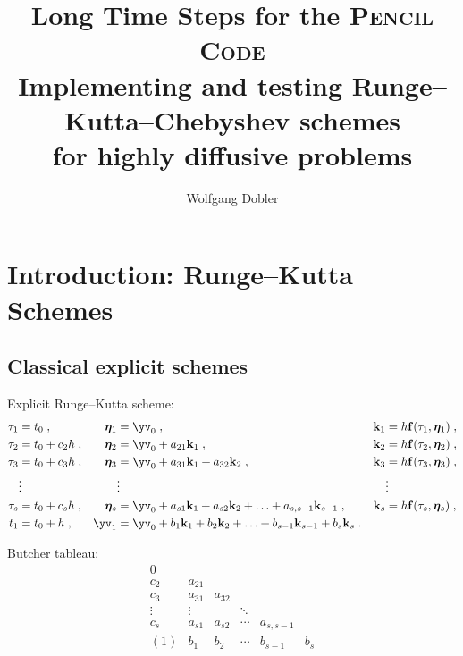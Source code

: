 \documentclass[\mydriver,12pt,twoside,notitlepage]{article}
\title{Long Time Steps for the \textsc{Pencil Code}\\[1.5ex]
  {\large Implementing and testing Runge--Kutta--Chebyshev schemes\\
    for highly diffusive problems}
}
\author{Wolfgang Dobler}
\newcommand{\etav}    {\bm{\eta}}
\newcommand{\fv}      {\mathbf{f}}
\newcommand{\kv}      {\mathbf{k}}
\begin{document}
\thispagestyle{empty}

\maketitle

\clearpage
\tableofcontents
\clearpage

\section{Introduction: Runge--Kutta Schemes}

\subsection{Classical explicit schemes}
Explicit Runge--Kutta scheme:
\begin{align}
  \tau_1 &= t_0 \; ,
            & \etav_1 &= \yv_0 \; ,
                         & \kv_1 &= h\fv(\tau_1, \etav_1) \; ,\\
  \tau_2 &= t_0 + c_2 h \; ,
            & \etav_2 &= \yv_0 + a_{21} \kv_1 \; ,
                         & \kv_2 &= h\fv(\tau_2, \etav_2) \; ,\\
  \tau_3 &= t_0 + c_3 h \; ,
            & \etav_3 &= \yv_0 + a_{31} \kv_1 + a_{32} \kv_2 \; ,
                         & \kv_3 &= h\fv(\tau_3, \etav_3) \; ,\\
  & \vdots &  & \vdots  &  &\vdots \nonumber \\
  \tau_s &= t_0 + c_s h \; ,
            & \etav_s &= \yv_0 + a_{s1} \kv_1 + a_{s2} \kv_2
             + \ldots + a_{s,s-1} \kv_{s-1} \; ,
                              & \kv_s &= h\fv(\tau_s, \etav_s) \; ,\\
  t_1 &= t_0 + h \; ,
            & \yv_1   &= \yv_0 + b_1 \kv_1 + b_2 \kv_2
                         + \ldots + b_{s-1} \kv_{s-1} + b_{s} \kv_{s} \; .
\end{align}


Butcher tableau:
\begin{equation}
  \begin{array}{c|ccccc}
    0                                                 \\
    c_2    & a_{21}                                   \\
    c_3    & a_{31} & a_{32}                          \\
    \vdots & \vdots &        & \ddots &               \\
    c_s    & a_{s1} & a_{s2} & \cdots & a_{s,s-1}     \\
    \hline
    (1)    & b_1    & b_2    & \cdots & b_{s-1} & b_s
  \end{array}
\end{equation}
\end{document}
